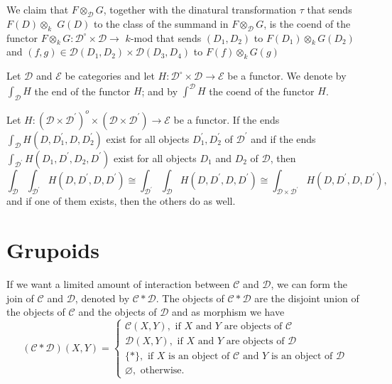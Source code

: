 \begin{example}
\begin{enumerate}
        We claim that $F \otimes_{\mathcal{D}} G$, together with the dinatural transformation $\tau$ that sends $F(D) \otimes_k$ $G(D)$ to the class of the summand in $F \otimes_{\mathcal{D}} G$, is the coend of the functor $F \otimes_k G: \mathcal{D}^{\circ} \times \mathcal{D} \rightarrow$ $k$-mod that sends $\left(D_1, D_2\right)$ to $F\left(D_1\right) \otimes_k G\left(D_2\right)$ and $(f, g) \in \mathcal{D}\left(D_1, D_2\right) \times \mathcal{D}\left(D_3, D_4\right)$ to $F(f) \otimes_k G(g)$
\end{enumerate}
\end{example}

Let $\mathcal{D}$ and $\mathcal{E}$ be categories and let $H: \mathcal{D}^{\circ} \times \mathcal{D} \rightarrow \mathcal{E}$ be a functor. We denote by $\int_{\mathcal{D}} H$ the end of the functor $H$; and by $\int^{\mathcal{D}} H$ the coend of the functor $H$.\\

\begin{prop} Let $H:\left(\mathcal{D} \times \mathcal{D}^{\prime}\right)^o \times\left(\mathcal{D} \times \mathcal{D}^{\prime}\right) \rightarrow \mathcal{E}$ be a functor. If the ends $\int_{\mathcal{D}} H\left(D, D_1^{\prime}, D, D_2^{\prime}\right)$ exist for all objects $D_1^{\prime}, D_2^{\prime}$ of $\mathcal{D}^{\prime}$ and if the ends $\int_{\mathcal{D}^{\prime}} H\left(D_1, D^{\prime}, D_2, D^{\prime}\right)$ exist for all objects $D_1$ and $D_2$ of $\mathcal{D}$, then
$$
\int_{\mathcal{D}} \int_{\mathcal{D}^{\prime}} H\left(D, D^{\prime}, D, D^{\prime}\right) \cong \int_{\mathcal{D}^{\prime}} \int_{\mathcal{D}} H\left(D, D^{\prime}, D, D^{\prime}\right) \cong \int_{\mathcal{D} \times \mathcal{D}^{\prime}} H\left(D, D^{\prime}, D, D^{\prime}\right),
$$
and if one of them exists, then the others do as well.
\end{prop} 



\section{Grupoids}

If we want a limited amount of interaction between $\mathcal{C}$ and $\mathcal{D}$, we can form the join of $\mathcal{C}$ and $\mathcal{D}$, denoted by $\mathcal{C} * \mathcal{D}$. The objects of $\mathcal{C} * \mathcal{D}$ are the disjoint union of the objects of $\mathcal{C}$ and the objects of $\mathcal{D}$ and as morphism we have
$$
(\mathcal{C} * \mathcal{D})(X, Y)=\left\{\begin{array}{l}
\mathcal{C}(X, Y), \text { if } X \text { and } Y \text { are objects of } \mathcal{C} \\
\mathcal{D}(X, Y), \text { if } X \text { and } Y \text { are objects of } \mathcal{D} \\
\{*\}, \text { if } X \text { is an object of } \mathcal{C} \text { and } Y \text { is an object of } \mathcal{D} \\
\varnothing, \text { otherwise. }
\end{array}\right.
$$

